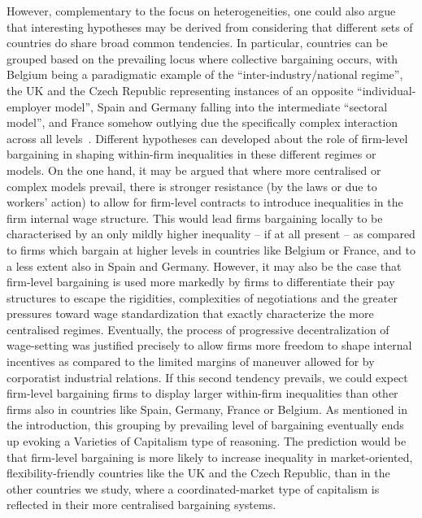 \documentclass[12pt]{article}
\begin{document}
However, complementary to the focus on heterogeneities, one could also
argue that interesting hypotheses may be derived from considering that
different sets of countries do share broad common tendencies. In
particular, countries can be grouped based on the prevailing locus
where collective bargaining occurs, with Belgium being a paradigmatic
example of the ``inter-industry/national regime'', the UK and the
Czech Republic representing instances of an opposite
``individual-employer model'', Spain and Germany falling into the
intermediate ``sectoral model'', and France somehow outlying due the
specifically complex interaction across all
levels~\citep{fulton.2013}. Different hypotheses can developed about
the role of firm-level bargaining in shaping within-firm inequalities
in these different regimes or models. On the one hand, it may be
argued that where more centralised or complex models prevail, there is
stronger resistance (by the laws or due to workers' action) to allow
for firm-level contracts to introduce inequalities in the firm
internal wage structure. This would lead firms bargaining locally to
be characterised by an only mildly higher inequality -- if at all
present -- as compared to firms which bargain at higher levels in
countries like Belgium or France, and to a less extent also in Spain
and Germany. However, it may also be the case that firm-level
bargaining is used more markedly by firms to differentiate their pay
structures to escape the rigidities, complexities of negotiations and
the greater pressures toward wage standardization that exactly
characterize the more centralised regimes. Eventually, the process of
progressive decentralization of wage-setting was justified precisely
to allow firms more freedom to shape internal incentives as compared
to the limited margins of maneuver allowed for by corporatist
industrial relations. If this second tendency prevails, we could
expect firm-level bargaining firms to display larger within-firm
inequalities than other firms also in countries like Spain, Germany,
France or Belgium. As mentioned in the introduction, this grouping by
prevailing level of bargaining eventually ends up evoking a Varieties
of Capitalism type of reasoning. The prediction would be that
firm-level bargaining is more likely to increase inequality in
market-oriented, flexibility-friendly countries like the UK and the
Czech Republic, than in the other countries we study, where a
coordinated-market type of capitalism is reflected in their more
centralised bargaining systems.
\end{document}
